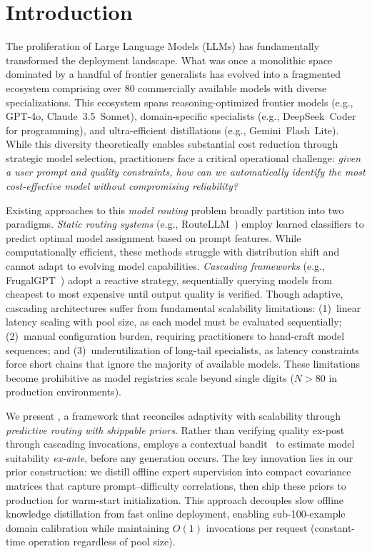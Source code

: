 
\section{Introduction}
\label{sec:introduction}

The proliferation of Large Language Models (LLMs) has fundamentally transformed the deployment landscape. What was once a monolithic space dominated by a handful of frontier generalists has evolved into a fragmented ecosystem comprising over 80 commercially available models with diverse specializations. This ecosystem spans reasoning-optimized frontier models (e.g., GPT-4o, Claude~3.5~Sonnet), domain-specific specialists (e.g., DeepSeek~Coder for programming), and ultra-efficient distillations (e.g., Gemini~Flash~Lite). While this diversity theoretically enables substantial cost reduction through strategic model selection, practitioners face a critical operational challenge: \emph{given a user prompt and quality constraints, how can we automatically identify the most cost-effective model without compromising reliability?}

Existing approaches to this \emph{model routing} problem broadly partition into two paradigms. \emph{Static routing systems} (e.g., RouteLLM~\cite{ong2024routellm}) employ learned classifiers to predict optimal model assignment based on prompt features. While computationally efficient, these methods struggle with distribution shift and cannot adapt to evolving model capabilities. \emph{Cascading frameworks} (e.g., FrugalGPT~\cite{chen2023frugalgpt}) adopt a reactive strategy, sequentially querying models from cheapest to most expensive until output quality is verified. Though adaptive, cascading architectures suffer from fundamental scalability limitations: (1)~linear latency scaling with pool size, as each model must be evaluated sequentially; (2)~manual configuration burden, requiring practitioners to hand-craft model sequences; and (3)~underutilization of long-tail specialists, as latency constraints force short chains that ignore the majority of available models. These limitations become prohibitive as model registries scale beyond single digits ($N > 80$ in production environments).

We present \ours{}, a framework that reconciles adaptivity with scalability through \emph{predictive routing with shippable priors}. Rather than verifying quality ex-post through cascading invocations, \ours{} employs a contextual bandit~\cite{slivkins2019contextual} to estimate model suitability \emph{ex-ante}, before any generation occurs. The key innovation lies in our prior construction: we distill offline expert supervision into compact covariance matrices that capture prompt--difficulty correlations, then ship these priors to production for warm-start initialization. This approach decouples slow offline knowledge distillation from fast online deployment, enabling sub-100-example domain calibration while maintaining $O(1)$ invocations per request (constant-time operation regardless of pool size).

